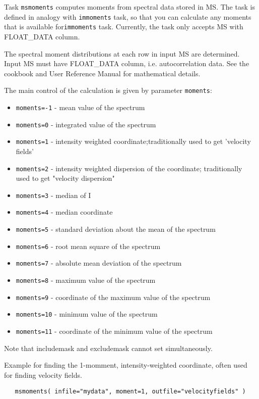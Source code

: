 Task {\tt msmoments} computes moments from spectral data stored
in MS. The task is defined in analogy with {\tt immoments} task,
so that you can calculate any moments that is available
for{\tt  immoments} task. Currently, the task only accepts MS
with FLOAT\_DATA column.

The spectral moment distributions at each row in input MS are
determined. Input MS must have FLOAT\_DATA column, i.e. 
autocorrelation data.  
See the cookbook and User Reference Manual for
mathematical details.

The main control of the calculation is given by parameter {\tt moments}:
        
\begin{itemize}
   \item {\tt moments=-1} - mean value of the spectrum
   \item {\tt moments=0}  - integrated value of the spectrum
   \item {\tt moments=1}  - intensity weighted coordinate;traditionally used to get 'velocity fields'
   \item {\tt moments=2}  - intensity weighted dispersion of the coordinate; traditionally used to get "velocity dispersion"
   \item {\tt moments=3}  - median of I
   \item {\tt moments=4}  - median coordinate
   \item {\tt moments=5}  - standard deviation about the mean of the spectrum
   \item {\tt moments=6}  - root mean square of the spectrum
   \item {\tt moments=7}  - absolute mean deviation of the spectrum
   \item {\tt moments=8}  - maximum value of the spectrum
   \item {\tt moments=9}  - coordinate of the maximum value of the spectrum
   \item {\tt moments=10} - minimum value of the spectrum
   \item {\tt moments=11} - coordinate of the minimum value of the spectrum
\end{itemize}

Note that includemask and excludemask cannot set simultaneously. 

Example for finding the 1-momment, intensity-weighted
coordinate, often used for finding velocity fields.

\begin{verbatim}
   msmoments( infile="mydata", moment=1, outfile="velocityfields" )
\end{verbatim}



